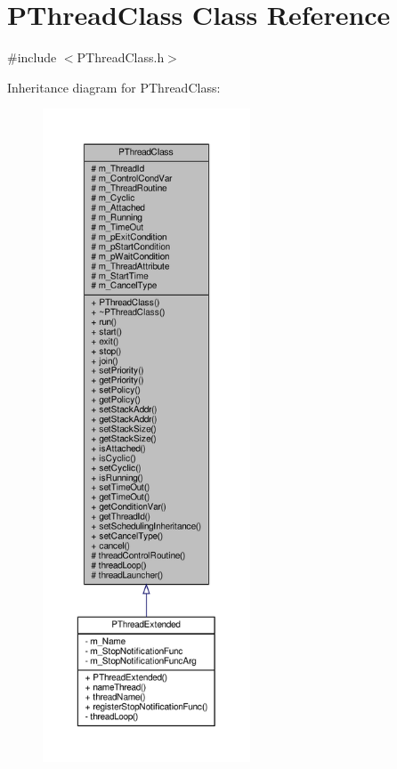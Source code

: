 \hypertarget{classPThreadClass}{}\section{P\+Thread\+Class Class Reference}
\label{classPThreadClass}


{\ttfamily \#include $<$P\+Thread\+Class.\+h$>$}



Inheritance diagram for P\+Thread\+Class\+:\nopagebreak
\begin{figure}[H]
\begin{center}
\leavevmode
\includegraphics[height=550pt]{classPThreadClass__inherit__graph}
\end{center}
\end{figure}
